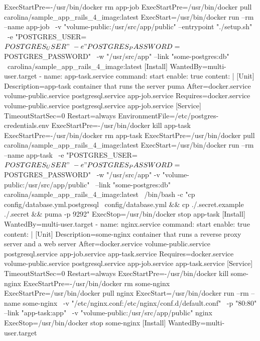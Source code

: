 \begin{codelisting}
\begin{code}
      ExecStartPre=-/usr/bin/docker rm app-job 
      ExecStartPre=/usr/bin/docker pull carolina/sample_app_rails_4_image:latest 
      ExecStart=/usr/bin/docker run --rm --name app-job \
                -v "volume-public:/usr/src/app/public" --entrypoint "./setup.sh" \
      -e "POSTGRES_USER=${POSTGRES_USER}" \
      -e "POSTGRES_PASSWORD=${POSTGRES_PASSWORD}" \
      -w "/usr/src/app" --link "some-postgres:db" \
      carolina/sample_app_rails_4_image:latest
      [Install] 
      WantedBy=multi-user.target
  - name: app-task.service
    command: start
    enable: true
    content: |
      [Unit] 
      Description=app-task container that runs the server puma
      After=docker.service volume-public.service postgresql.service 
            app-job.service
      Requires=docker.service volume-public.service postgresql.service 
               app-job.service
      [Service] 
      TimeoutStartSec=0
      Restart=always 
      EnvironmentFile=/etc/postgres-credentials.env
      ExecStartPre=-/usr/bin/docker kill app-task 
      ExecStartPre=-/usr/bin/docker rm app-task
      ExecStartPre=/usr/bin/docker pull carolina/sample_app_rails_4_image:latest 
      ExecStart=/usr/bin/docker run --rm --name app-task \
      -e "POSTGRES_USER=${POSTGRES_USER}" \
      -e "POSTGRES_PASSWORD=${POSTGRES_PASSWORD}" \
      -w "/usr/src/app" -v "volume-public:/usr/src/app/public" \
      --link "some-postgres:db" carolina/sample_app_rails_4_image:latest \
      /bin/bash -c "cp config/database.yml.postgresql \
      config/database.yml && cp ./.secret.example ./.secret && puma -p 9292"
      ExecStop=/usr/bin/docker stop app-task
      [Install] 
      WantedBy=multi-user.target
  - name: nginx.service
    command: start
    enable: true
    content: |
      [Unit] 
      Description=some-nginx container that runs a reverse proxy server and 
                  a web server
      After=docker.service volume-public.service postgresql.service 
            app-job.service app-task.service
      Requires=docker.service volume-public.service postgresql.service 
               app-job.service app-task.service
      [Service] 
      TimeoutStartSec=0
      Restart=always 
      ExecStartPre=-/usr/bin/docker kill some-nginx 
      ExecStartPre=-/usr/bin/docker rm some-nginx
      ExecStartPre=/usr/bin/docker pull nginx 
      ExecStart=/usr/bin/docker run --rm --name some-nginx \
      -v "/etc/nginx.conf:/etc/nginx/conf.d/default.conf" \
      -p "80:80" --link "app-task:app" \
      -v "volume-public:/usr/src/app/public" nginx 
      ExecStop=/usr/bin/docker stop some-nginx
      [Install] 
      WantedBy=multi-user.target
  \end{code}
\end{codelisting}


